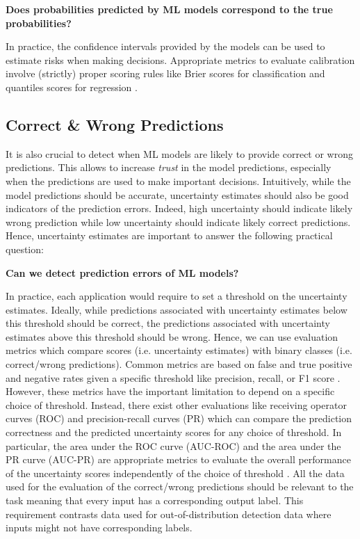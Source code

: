 \begin{center}
    \textbf{Does probabilities predicted by ML models correspond to the true probabilities?}
\end{center}

In practice, the confidence intervals provided by the models can be used to estimate risks when making decisions. Appropriate metrics to evaluate calibration involve (strictly) proper scoring rules like Brier scores for classification and quantiles scores for regression \cite{scoring-rules}.

\subsection{Correct \& Wrong Predictions}

It is also crucial to detect when ML models are likely to provide correct or wrong predictions. This allows to increase \emph{trust} in the model predictions, especially when the predictions are used to make important decisions. Intuitively, while the model predictions should be accurate, uncertainty estimates should also be good indicators of the prediction errors. Indeed, high uncertainty should indicate likely wrong prediction while low uncertainty should indicate likely correct predictions. Hence, uncertainty estimates are important to answer the following practical question:

\begin{center}
    \textbf{Can we detect prediction errors of ML models?}
\end{center}

In practice, each application would require to set a threshold on the uncertainty estimates. Ideally, while predictions associated with uncertainty estimates below this threshold should be correct, the predictions associated with uncertainty estimates above this threshold should be wrong. Hence, we can use evaluation metrics which compare scores (i.e. uncertainty estimates) with binary classes (i.e. correct/wrong predictions). Common metrics are based on false and true positive and negative rates given a specific threshold like precision, recall, or F1 score \cite{powers2011evaluation}. However, these metrics have the important limitation to depend on a specific choice of threshold. Instead, there exist other evaluations like receiving operator curves (ROC) and precision-recall curves (PR) which can compare the prediction correctness and the predicted uncertainty scores for any choice of threshold. In particular, the area under the ROC curve (AUC-ROC) and the area under the PR curve (AUC-PR) are appropriate metrics to evaluate the overall performance of the uncertainty scores independently of the choice of threshold \cite{apr_auroc}. All the data used for the evaluation of the correct/wrong predictions should be relevant to the task meaning that every input has a corresponding output label. This requirement contrasts data used for out-of-distribution detection data where inputs might not have corresponding labels.


